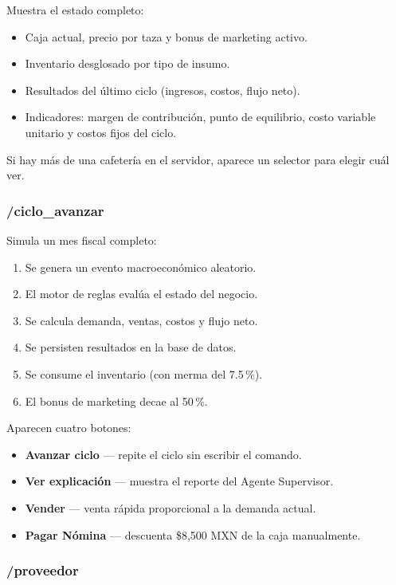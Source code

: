 \documentclass[12pt,spanish]{article}
\begin{document}
Muestra el estado completo:
\begin{itemize}
  \item Caja actual, precio por taza y bonus de marketing activo.
  \item Inventario desglosado por tipo de insumo.
  \item Resultados del último ciclo (ingresos, costos, flujo neto).
  \item Indicadores: margen de contribución, punto de equilibrio,
        costo variable unitario y costos fijos del ciclo.
\end{itemize}

Si hay más de una cafetería en el servidor, aparece un selector para elegir cuál ver.

\subsubsection*{/ciclo\_avanzar}

Simula un mes fiscal completo:
\begin{enumerate}
  \item Se genera un evento macroeconómico aleatorio.
  \item El motor de reglas evalúa el estado del negocio.
  \item Se calcula demanda, ventas, costos y flujo neto.
  \item Se persisten resultados en la base de datos.
  \item Se consume el inventario (con merma del 7.5\,\%).
  \item El bonus de marketing decae al 50\,\%.
\end{enumerate}

Aparecen cuatro botones:
\begin{itemize}
  \item \textbf{Avanzar ciclo} — repite el ciclo sin escribir el comando.
  \item \textbf{Ver explicación} — muestra el reporte del Agente Supervisor.
  \item \textbf{Vender} — venta rápida proporcional a la demanda actual.
  \item \textbf{Pagar Nómina} — descuenta \$8,500 MXN de la caja manualmente.
\end{itemize}

\subsubsection*{/proveedor}
\end{document}
